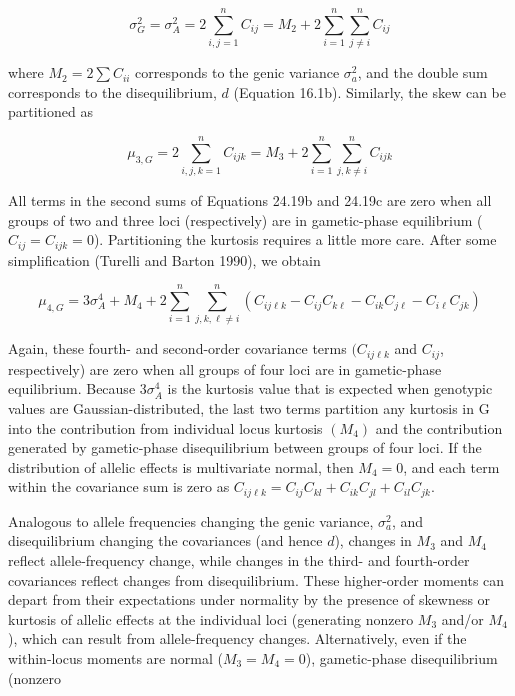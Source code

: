 \documentclass{article}
\begin{document}
\begin{equation}
\sigma_{G}^{2}=\sigma_{A}^{2}=2\sum_{i,j=1}^{n}C_{ij}=M_{2}+2\sum_{i=1}^{n}\sum_{j\neq i}^{n}C_{ij}
\tag{24.19b}
\label{eq:24_19b}
\end{equation}

where  $ M_2 = 2 \sum C_{ii} $ corresponds to the genic variance  $ \sigma_a^2 $, and the double sum corresponds to the disequilibrium,  $ d $ (Equation 16.1b). Similarly, the skew can be partitioned as

\begin{equation}
\mu_{3,G}=2\sum_{i,j,k=1}^{n}C_{ijk}=M_{3}+2\sum_{i=1}^{n}\sum_{j,k\neq i}^{n}C_{ijk}
\tag{24.19c}
\label{eq:24_19c}
\end{equation}

All terms in the second sums of Equations 24.19b and 24.19c are zero when all groups of two and three loci (respectively) are in gametic-phase equilibrium ( $ C_{ij} = C_{ijk} = 0 $). Partitioning the kurtosis requires a little more care. After some simplification (Turelli and Barton 1990), we obtain

\begin{equation}
\mu_{4,G}=3\sigma_{A}^{4}+M_{4}+2\sum_{i=1}^{n}\sum_{j,k,\ell\neq i}^{n}\left(C_{i j\ell k}-C_{i j}C_{k\ell}-C_{i k}C_{j\ell}-C_{i\ell}C_{j k}\right)
\tag{24.19d}
\label{eq:24_19d}
\end{equation}

Again, these fourth- and second-order covariance terms  $ (C_{ij\ell k} $ and  $ C_{ij} $, respectively) are zero when all groups of four loci are in gametic-phase equilibrium. Because  $ 3\sigma_A^4 $ is the kurtosis value that is expected when genotypic values are Gaussian-distributed, the last two terms partition any kurtosis in G into the contribution from individual locus kurtosis  $ (M_4) $ and the contribution generated by gametic-phase disequilibrium between groups of four loci. If the distribution of allelic effects is multivariate normal, then  $ M_4 = 0 $, and each term within the covariance sum is zero as  $ C_{ij\ell k} = C_{ij}C_{kl} + C_{ik}C_{jl} + C_{il}C_{jk} $.

Analogous to allele frequencies changing the genic variance, $\sigma_a^2$, and disequilibrium changing the covariances (and hence $d$), changes in $M_3$ and $M_4$ reflect allele-frequency change, while changes in the third- and fourth-order covariances reflect changes from disequilibrium. These higher-order moments can depart from their expectations under normality by the presence of skewness or kurtosis of allelic effects at the individual loci (generating nonzero $M_3$ and/or $M_4$), which can result from allele-frequency changes. Alternatively, even if the within-locus moments are normal ($M_3 = M_4 = 0$), gametic-phase disequilibrium (nonzero
\end{document}

